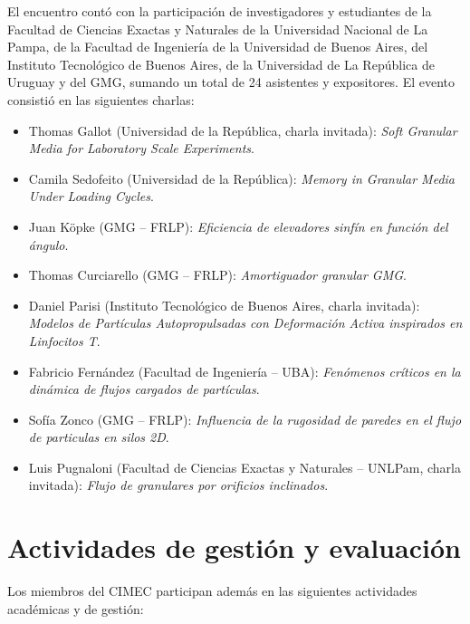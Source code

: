 \documentclass[a4paper,11pt,twoside,final,titlepage,onecolumn,openright]{report}
\begin{document}
El encuentro contó con la participación de investigadores y estudiantes de la Facultad de Ciencias Exactas y Naturales de la Universidad Nacional de La Pampa, de la Facultad de Ingeniería de la Universidad de Buenos Aires, del Instituto Tecnológico de Buenos Aires, de la Universidad de La República de Uruguay y del GMG, sumando un total de 24 asistentes y expositores. El evento consistió en las siguientes charlas:
\begin{itemize}
	\item Thomas Gallot (Universidad de la República, charla invitada): \textit{Soft Granular Media for Laboratory Scale Experiments}.
	\item Camila Sedofeito (Universidad de la República): \textit{Memory in Granular Media Under Loading Cycles}.
	\item Juan Köpke (GMG – FRLP): \textit{Eficiencia de elevadores sinfín en función del ángulo}.
	\item Thomas Curciarello (GMG – FRLP): \textit{Amortiguador granular GMG}.
	\item Daniel Parisi (Instituto Tecnológico de Buenos Aires, charla invitada): \textit{Modelos de Partículas Autopropulsadas con Deformación Activa inspirados en Linfocitos T}.
	\item Fabricio Fernández (Facultad de Ingeniería – UBA): \textit{Fenómenos críticos en la dinámica de flujos cargados de partículas}.
	\item Sofía Zonco (GMG – FRLP): \textit{Influencia de la rugosidad de paredes en el flujo de particulas en silos 2D}.
	\item Luis Pugnaloni (Facultad de Ciencias Exactas y Naturales – UNLPam, charla invitada): \textit{Flujo de granulares por orificios inclinados}.
\end{itemize}



\section{Actividades de gestión y evaluación}

Los miembros del CIMEC participan además en las siguientes actividades académicas y de gestión:
\end{document}
